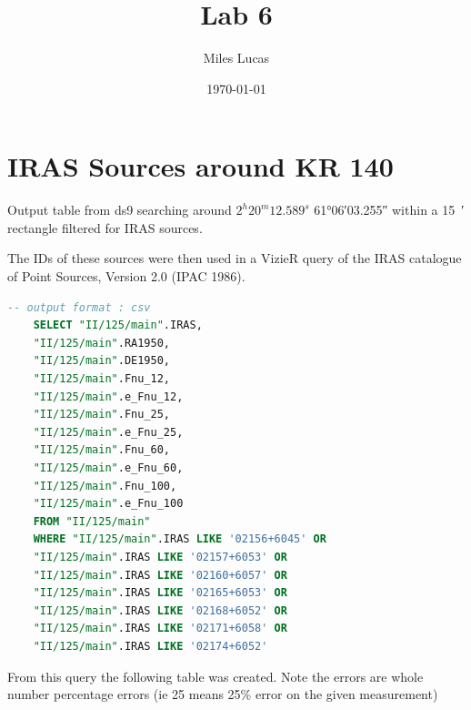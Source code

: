 \documentclass[]{article}
\title{Lab 6}
\author{Miles Lucas}
\date{\today}
\begin{document}
\maketitle

\section{IRAS Sources around KR 140}

Output table from ds9 searching around $ 2^h 20^m 12.589^s $ \ang{+61;06;03.255} within a \SI{15}{\arcminute} rectangle filtered for IRAS sources.
\begin{table}[H]
	\centering
	\label{tab:iras}
\end{table}


The IDs of these sources were then used in a VizieR query of the IRAS catalogue of Point Sources, Version 2.0 (IPAC 1986).

\begin{lstlisting}[language=SQL,basicstyle=\footnotesize,frame=single,]
	-- output format : csv
	SELECT "II/125/main".IRAS,  
	"II/125/main".RA1950,  
	"II/125/main".DE1950,  
	"II/125/main".Fnu_12,  
	"II/125/main".e_Fnu_12,  
	"II/125/main".Fnu_25,
	"II/125/main".e_Fnu_25,  
	"II/125/main".Fnu_60,  
	"II/125/main".e_Fnu_60,  
	"II/125/main".Fnu_100,  
	"II/125/main".e_Fnu_100  
	FROM "II/125/main"
	WHERE "II/125/main".IRAS LIKE '02156+6045' OR
	"II/125/main".IRAS LIKE '02157+6053' OR
	"II/125/main".IRAS LIKE '02160+6057' OR
	"II/125/main".IRAS LIKE '02165+6053' OR
	"II/125/main".IRAS LIKE '02168+6052' OR
	"II/125/main".IRAS LIKE '02171+6058' OR
	"II/125/main".IRAS LIKE '02174+6052'
\end{lstlisting}

From this query the following table was created. Note the errors are whole number percentage errors (ie 25 means 25\% error on the given measurement)
\begin{table}[H]
	\centering
	\label{tab:iras-result}
\end{table}
\end{document}
